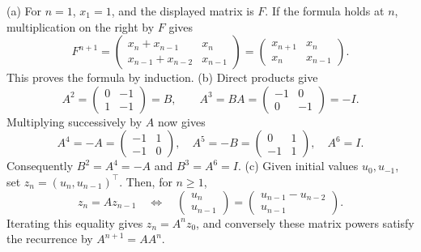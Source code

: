 \begin{solution}
(a) For $n=1$, $x_1=1$, and the displayed matrix is $F$.
If the formula holds at $n$, multiplication on the right by $F$ gives
\[
F^{n+1}=
\begin{pmatrix}x_n+x_{n-1}&x_n\\x_{n-1}+x_{n-2}&x_{n-1}\end{pmatrix}
=\begin{pmatrix}x_{n+1}&x_n\\x_n&x_{n-1}\end{pmatrix}.
\]
This proves the formula by induction.
(b) Direct products give
\[
A^2=\begin{pmatrix}0&-1\\1&-1\end{pmatrix}=B,
\qquad A^3=BA=\begin{pmatrix}-1&0\\0&-1\end{pmatrix}=-I.
\]
Multiplying successively by $A$ now gives
\[
A^4=-A=\begin{pmatrix}-1&1\\-1&0\end{pmatrix},\quad
A^5=-B=\begin{pmatrix}0&1\\-1&1\end{pmatrix},\quad A^6=I.
\]
Consequently $B^2=A^4=-A$ and $B^3=A^6=I$.
(c) Given initial values $u_0,u_{-1}$, set $z_n=(u_n,u_{n-1})^\top$.
Then, for $n\geqslant1$,
\[
z_n=Az_{n-1}
\quad\Longleftrightarrow\quad
\begin{pmatrix}u_n\\u_{n-1}\end{pmatrix}
=\begin{pmatrix}u_{n-1}-u_{n-2}\\u_{n-1}\end{pmatrix}.
\]
Iterating this equality gives $z_n=A^nz_0$, and conversely these matrix powers
satisfy the recurrence by $A^{n+1}=AA^n$.
\end{solution}

